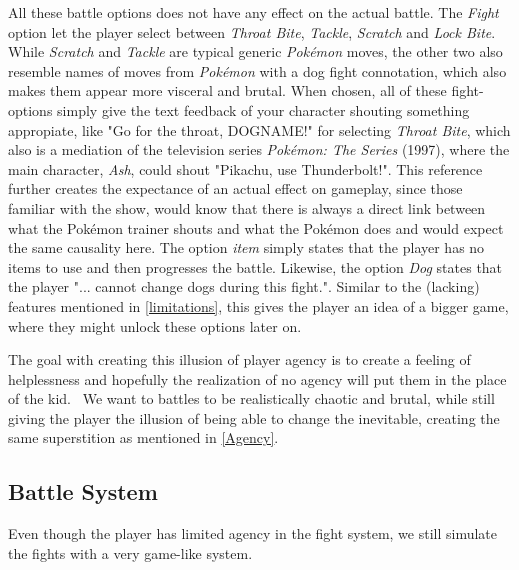 All these battle options does not have any effect on the actual battle. The \textit{Fight} option let the player select between \textit{Throat Bite}, \textit{Tackle}, \textit{Scratch} and \textit{Lock Bite}. While \textit{Scratch} and \textit{Tackle} are typical generic \textit{Pokémon} moves, the other two also resemble names of moves from \textit{Pokémon} with a dog fight connotation, which also makes them appear more visceral and brutal. When chosen, all of these fight-options simply give the text feedback of your character shouting something appropiate, like "Go for the throat, DOGNAME!" for selecting \textit{Throat Bite}, which also is a mediation of the television series \textit{Pokémon: The Series} (1997), where the main character, \textit{Ash}, could shout "Pikachu, use Thunderbolt!". This reference further creates the expectance of an actual effect on gameplay, since those familiar with the show, would know that there is always a direct link between what the Pokémon trainer shouts and what the Pokémon does and would expect the same causality here.
The option \textit{item} simply states that the player has no items to use and then progresses the battle. Likewise, the option \textit{Dog} states that the player "... cannot change dogs during this fight.". Similar to the (lacking) features mentioned in \ref{limitations}, this gives the player an idea of a bigger game, where they might unlock these options later on.\

The goal with creating this illusion of player agency is to create a feeling of helplessness and hopefully the realization of no agency will put them in the place of the kid. \ 
We want to battles to be realistically chaotic and brutal, while still giving the player the illusion of being able to change the inevitable, creating the same superstition as mentioned in \ref{Agency}.\

\subsection{Battle System}
\label{battleSystem}
Even though the player has limited agency in the fight system, we still simulate the fights with a very game-like system.\

